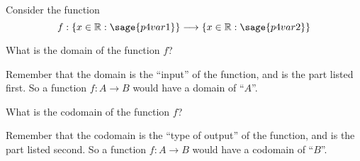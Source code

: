 \documentclass{ximera}
\begin{document}
\begin{problem}
    Consider the function 
    \[
        f:\{ x \in \mathbb{R} : \sage{p4var1} \} \longrightarrow \{ x \in \mathbb{R} : \sage{p4var2} \}
    \]
    
    What is the domain of the function $f$?
    \begin{multipleChoice}
    \end{multipleChoice}
    
    \begin{feedback}
        Remember that the domain is the ``input'' of the function, and is the part listed first. So a function $f:A\rightarrow B$ would have a domain of ``$A$''.
    \end{feedback}    
    
    What is the codomain of the function $f$?
    
    \begin{multipleChoice}
    \end{multipleChoice}
    
    \begin{feedback}
        Remember that the codomain is the ``type of output'' of the function, and is the part listed second. So a function $f:A\rightarrow B$ would have a codomain of ``$B$''.
    \end{feedback}    
\end{problem}
\end{document}
